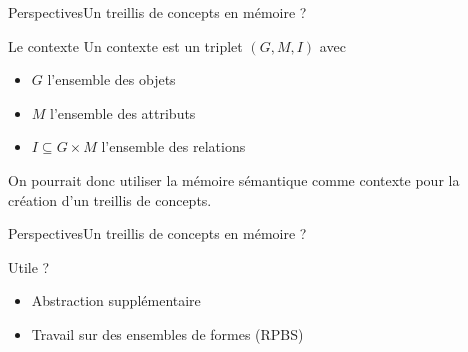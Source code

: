 \begin{frame}{Perspectives}{Un treillis de concepts en mémoire ?}
\begin{block}{Le contexte}
Un contexte est un triplet $(G,M,I)$ avec
\begin{itemize}
\item $G$ l'ensemble des objets
\item $M$ l'ensemble des attributs
\item $I \subseteq G \times M$ l'ensemble des relations
\end{itemize}
On pourrait donc utiliser la mémoire sémantique comme contexte pour la création d'un treillis de concepts.
\end{block}
\end{frame}

\begin{frame}{Perspectives}{Un treillis de concepts en mémoire ?}
\begin{block}{Utile ?}
\begin{itemize}
\item Abstraction supplémentaire
\item Travail sur des ensembles de formes (RPBS)
\end{itemize}
\end{block}
\end{frame}

